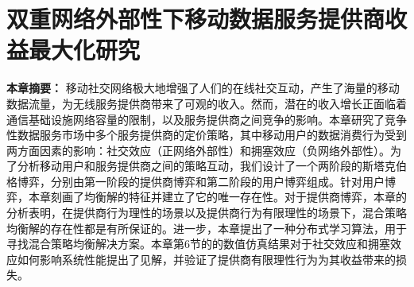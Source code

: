 \chapter{双重网络外部性下移动数据服务提供商收益最大化研究}

\textbf{本章摘要：} 
移动社交网络极大地增强了人们的在线社交互动，产生了海量的移动数据流量，为无线服务提供商带来了可观的收入。然而，潜在的收入增长正面临着通信基础设施网络容量的限制，以及服务提供商之间竞争的影响。本章研究了竞争性数据服务市场中多个服务提供商的定价策略，其中移动用户的数据消费行为受到两方面因素的影响：社交效应（正网络外部性）和拥塞效应（负网络外部性）。为了分析移动用户和服务提供商之间的策略互动，我们设计了一个两阶段的斯塔克伯格博弈，分别由第一阶段的提供商博弈和第二阶段的用户博弈组成。针对用户博弈，本章刻画了均衡解的特征并建立了它的唯一存在性。对于提供商博弈，本章的分析表明，在提供商行为理性的场景以及提供商行为有限理性的场景下，混合策略均衡解的存在性都是有所保证的。进一步，本章提出了一种分布式学习算法，用于寻找混合策略均衡解决方案。本章第6节的的数值仿真结果对于社交效应和拥塞效应如何影响系统性能提出了见解，并验证了提供商有限理性行为为其收益带来的损失。


